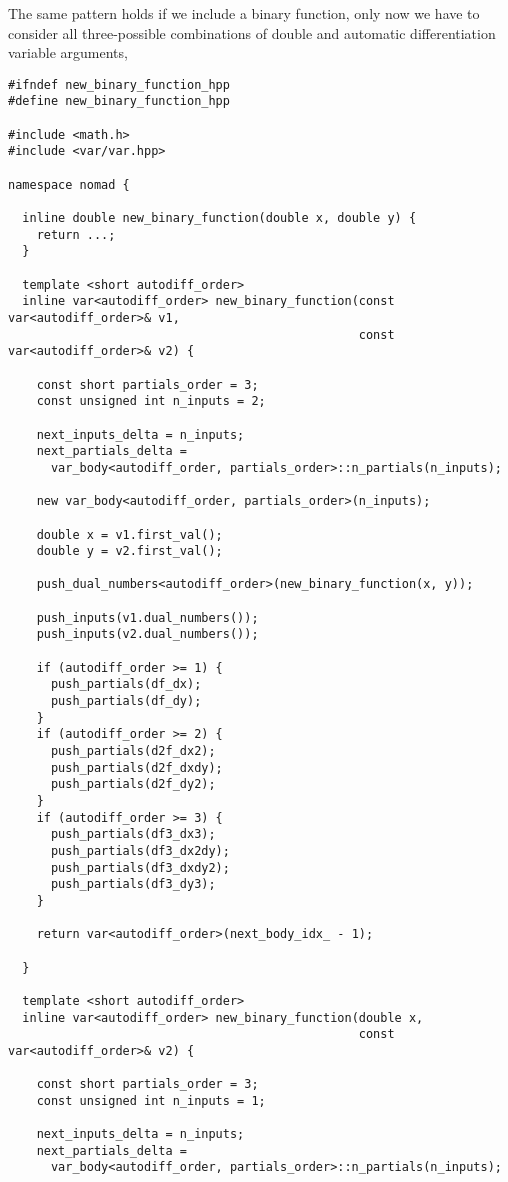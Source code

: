 The same pattern holds if we include a binary function, only now we have
to consider all three-possible combinations of double and automatic
differentiation variable arguments,
%
\begin{verbatim}
#ifndef new_binary_function_hpp
#define new_binary_function_hpp

#include <math.h>
#include <var/var.hpp>

namespace nomad {
  
  inline double new_binary_function(double x, double y) {
    return ...;
  }
  
  template <short autodiff_order>
  inline var<autodiff_order> new_binary_function(const var<autodiff_order>& v1,
                                                 const var<autodiff_order>& v2) {
    
    const short partials_order = 3;
    const unsigned int n_inputs = 2;
    
    next_inputs_delta = n_inputs;
    next_partials_delta =
      var_body<autodiff_order, partials_order>::n_partials(n_inputs);
    
    new var_body<autodiff_order, partials_order>(n_inputs);

    double x = v1.first_val();
    double y = v2.first_val();
    
    push_dual_numbers<autodiff_order>(new_binary_function(x, y));
    
    push_inputs(v1.dual_numbers());
    push_inputs(v2.dual_numbers());

    if (autodiff_order >= 1) {
      push_partials(df_dx);
      push_partials(df_dy);
    }
    if (autodiff_order >= 2) {
      push_partials(d2f_dx2);
      push_partials(d2f_dxdy);
      push_partials(d2f_dy2);
    }
    if (autodiff_order >= 3) {
      push_partials(df3_dx3);
      push_partials(df3_dx2dy);
      push_partials(df3_dxdy2);
      push_partials(df3_dy3);
    }

    return var<autodiff_order>(next_body_idx_ - 1);
    
  }
  
  template <short autodiff_order>
  inline var<autodiff_order> new_binary_function(double x,
                                                 const var<autodiff_order>& v2) {
    
    const short partials_order = 3;
    const unsigned int n_inputs = 1;
    
    next_inputs_delta = n_inputs;
    next_partials_delta =
      var_body<autodiff_order, partials_order>::n_partials(n_inputs);
    

\end{verbatim}

